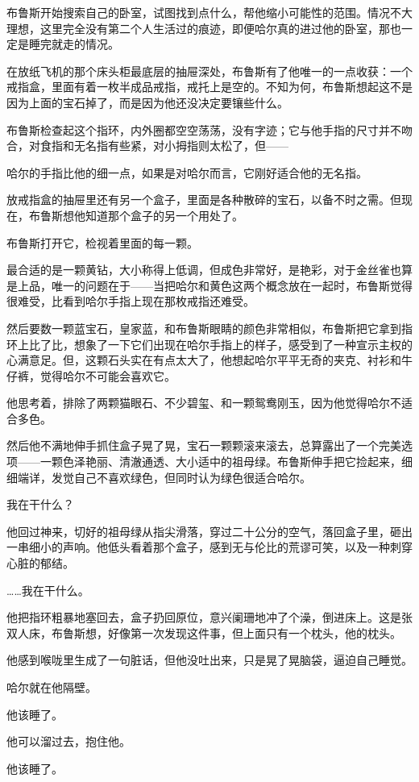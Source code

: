 \documentclass[../main.tex]{subfiles}
\begin{document}
布鲁斯开始搜索自己的卧室，试图找到点什么，帮他缩小可能性的范围。情况不大理想，这里完全没有第二个人生活过的痕迹，即便哈尔真的进过他的卧室，那也一定是睡完就走的情况。

在放纸飞机的那个床头柜最底层的抽屉深处，布鲁斯有了他唯一的一点收获：一个戒指盒，里面有着一枚半成品戒指，戒托上是空的。不知为何，布鲁斯想起这不是因为上面的宝石掉了，而是因为他还没决定要镶些什么。

布鲁斯检查起这个指环，内外圈都空空荡荡，没有字迹；它与他手指的尺寸并不吻合，对食指和无名指有些紧，对小拇指则太松了，但——

哈尔的手指比他的细一点，如果是对哈尔而言，它刚好适合他的无名指。

放戒指盒的抽屉里还有另一个盒子，里面是各种散碎的宝石，以备不时之需。但现在，布鲁斯想他知道那个盒子的另一个用处了。

布鲁斯打开它，检视着里面的每一颗。

最合适的是一颗黄钻，大小称得上低调，但成色非常好，是艳彩，对于金丝雀也算是上品，唯一的问题在于——当把哈尔和黄色这两个概念放在一起时，布鲁斯觉得很难受，比看到哈尔手指上现在那枚戒指还难受。

然后要数一颗蓝宝石，皇家蓝，和布鲁斯眼睛的颜色非常相似，布鲁斯把它拿到指环上比了比，想象了一下它们出现在哈尔手指上的样子，感受到了一种宣示主权的心满意足。但，这颗石头实在有点太大了，他想起哈尔平平无奇的夹克、衬衫和牛仔裤，觉得哈尔不可能会喜欢它。

他思考着，排除了两颗猫眼石、不少碧玺、和一颗鸳鸯刚玉，因为他觉得哈尔不适合多色。

然后他不满地伸手抓住盒子晃了晃，宝石一颗颗滚来滚去，总算露出了一个完美选项——一颗色泽艳丽、清澈通透、大小适中的祖母绿。布鲁斯伸手把它捡起来，细细端详，发觉自己不喜欢绿色，但同时认为绿色很适合哈尔。

我在干什么？

他回过神来，切好的祖母绿从指尖滑落，穿过二十公分的空气，落回盒子里，砸出一串细小的声响。他低头看着那个盒子，感到无与伦比的荒谬可笑，以及一种刺穿心脏的郁结。

……我在干什么。

他把指环粗暴地塞回去，盒子扔回原位，意兴阑珊地冲了个澡，倒进床上。这是张双人床，布鲁斯想，好像第一次发现这件事，但上面只有一个枕头，他的枕头。

他感到喉咙里生成了一句脏话，但他没吐出来，只是晃了晃脑袋，逼迫自己睡觉。

哈尔就在他隔壁。

他该睡了。

他可以溜过去，抱住他。

他该睡了。
\end{document}

